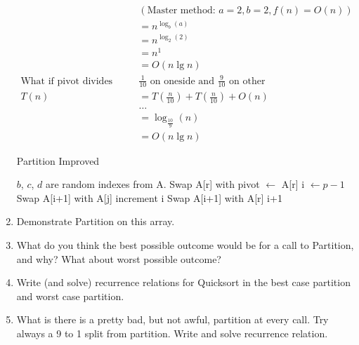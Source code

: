 \documentclass[12pt]{report}
\begin{document}
\begin{enumerate}[label=\arabic*.,start=2]
\begin{equation*}
\begin{aligned}
					 &(\mbox{Master method: } a=2, b=2, f(n)=O(n))\\
					 &= n^{\log_{b}(a)}\\
					 &= n^{\log_{2}(2)}\\
					 &= n^{1}\\
					 &= O(n\lg n)\\
			\mbox{What if pivot divides items} &\frac{1}{10} \mbox{ on oneside and } \frac{9}{10} \mbox{ on other}\\
				T(n) &= T\left( \frac{n}{10} \right) + T\left( \frac{n}{10} \right) + O(n)\\ %
					 & \dots\\
					 &= \log_{\frac{10}{9}}(n)\\
					 &= O(n\lg n)
    	\end{aligned}
    	\end{equation*} \begin{algorithm}[H]
    		\caption{Partition Improved}\label{alg:partition-improved}
    		\begin{algorithmic}[1]
				\State $b$, $c$, $d$ are random indexes from A.
				\State Swap A[r] with 
				\State pivot $\gets$ A[r]
    			\State i $\gets p-1$
						\State Swap A[i+1] with A[j]
						\State increment i
					\EndIf
				\EndFor
			\State Swap A[i+1] with A[r]
			\State \Return i+1
    		\EndFunction
    		\end{algorithmic}
    	\end{algorithm}
	\item Demonstrate Partition on this array.
	\item What do you think the best possible outcome would be for a call to Partition, and why? What about worst possible outcome?
	\item Write (and solve) recurrence relations for Quicksort in the best case partition and worst case partition.
	\item What is there is a pretty bad, but not awful, partition at every call. Try always a 9 to 1 split from partition. Write and solve recurrence relation.
\end{enumerate}
\end{document}
